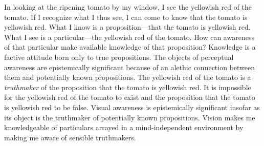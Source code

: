 \documentclass[12pt]{article}
\begin{document}
In looking at the ripening tomato by my window, I see the yellowish red of the tomato. If I recognize what I thus see, I can come to know that the tomato is yellowish red. What I know is a proposition---that the tomato is yellowish red. What I see is a particular---the yellowish red of the tomato. How can awareness of that particular make available knowledge of that proposition? Knowledge is a factive attitude born only to true propositions. The objects of perceptual awareness are epistemically significant because of an alethic connection between them and potentially known propositions. The yellowish red of the tomato is a \emph{truthmaker} of the proposition that the tomato is yellowish red. It is impossible for the yellowish red of the tomato to exist and the proposition that the tomato is yellowish red to be false. %
Visual awareness is epistemically significant insofar as its object is the truthmaker of potentially known propositions. Vision makes me knowledgeable of particulars arrayed in a mind-independent environment by making me aware of sensible truthmakers.
\end{document}
